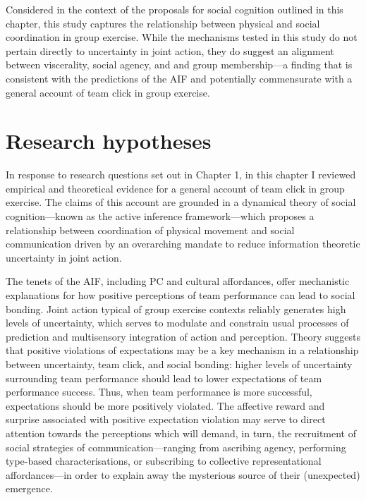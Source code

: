 \begin{CJK}{UTF8}{gbsn}
Considered in the context of the proposals for social cognition outlined in this chapter, this study captures the relationship between physical and social coordination in group exercise.  While the mechanisms tested in this study do not pertain directly to uncertainty in joint action, they do suggest an alignment between viscerality, social agency, and and group membership—a finding that is consistent with the predictions of the AIF and  potentially commensurate with a general account of team click in group exercise.

\section{Research hypotheses}
In response to research questions set out in Chapter 1, in this chapter I reviewed empirical and theoretical evidence for a general account of team click in group exercise. The claims of this account are grounded in a dynamical theory of social cognition---known as the active inference framework---which proposes a relationship between coordination of physical movement and social communication driven by an overarching mandate to reduce information theoretic uncertainty in joint action.

The tenets of the AIF, including PC and cultural affordances,  offer mechanistic explanations for how positive perceptions of team performance can lead to social bonding. Joint action typical of group exercise contexts reliably generates high levels of uncertainty, which serves to modulate and constrain usual processes of prediction and multisensory integration of action and perception.  Theory suggests that positive violations of expectations may be a key mechanism in a relationship between uncertainty, team click, and social bonding: higher levels of uncertainty surrounding team performance should lead to lower expectations of team performance success.  Thus, when team performance is more successful, expectations should be more positively violated.  The affective reward and surprise associated with positive expectation violation may serve to direct attention towards the perceptions which will demand, in turn, the recruitment of social strategies of communication---ranging from ascribing agency, performing type-based characterisations, or subscribing to collective representational affordances---in order to explain away the mysterious source of their (unexpected) emergence.





\end{CJK}
